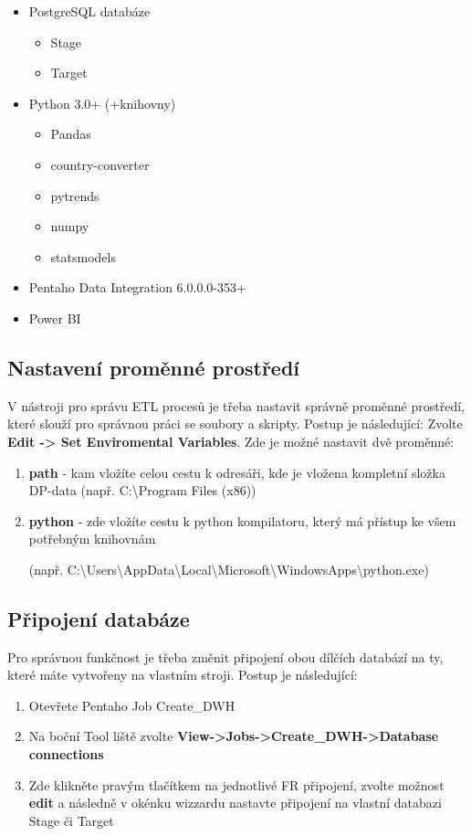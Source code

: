 \documentclass[thesis=M,czech]{FITthesis}[2022/10/08]
\begin{document}
\begin{itemize}
    \item PostgreSQL databáze
    \begin{itemize}
        \item Stage
        \item Target
    \end{itemize}
    \item Python 3.0+ \cite{python}(+knihovny)
    \begin{itemize}
        \item Pandas
        \item country-converter
        \item pytrends
        \item numpy
        \item statsmodels
    \end{itemize}
    \item Pentaho Data Integration 6.0.0.0-353+
    \item Power BI
\end{itemize}

\subsection{Nastavení proměnné prostředí}
V nástroji pro správu ETL procesů je třeba nastavit správně proměnné prostředí, které slouží pro správnou práci se soubory a skripty. Postup je následující:
Zvolte \textbf{Edit -> Set Enviromental Variables}.
Zde je možné nastavit dvě proměnné:

\begin{enumerate}
    \item \textbf{path} - kam vložíte celou cestu k odresáři, kde je vložena kompletní složka DP-data (např. C:\textbackslash Program Files (x86))
    \item \textbf{python} - zde vložíte cestu k python kompilatoru, který má přístup ke všem potřebným knihovnám 
    
    (např. C:\textbackslash Users\textbackslash AppData\textbackslash Local\textbackslash Microsoft\textbackslash WindowsApps\textbackslash python.exe)

\end{enumerate}

\subsection{Připojení databáze}
Pro správnou funkčnost je třeba změnit připojení obou dílčích databází na ty, které máte vytvořeny na vlastním stroji. Postup je následující:
\begin{enumerate}
    \item Otevřete Pentaho Job Create\_DWH
    \item Na boční Tool liště zvolte \textbf{View->Jobs->Create\_DWH->Database connections}
    \item Zde klikněte pravým tlačítkem na jednotlivé FR připojení, zvolte možnost \textbf{edit} a následně v okénku wizzardu nastavte připojení na vlastní databazi Stage či Target
    
\end{enumerate}
\end{document}
